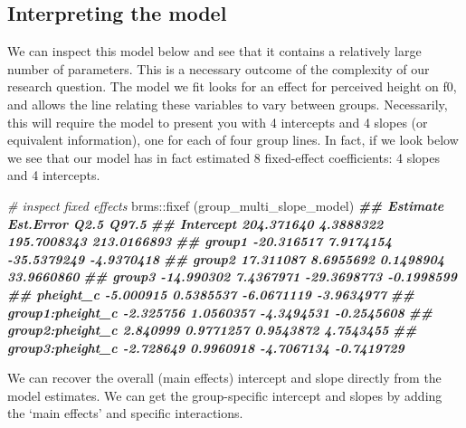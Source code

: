 \documentclass[
]{book}
\newenvironment{Shaded}{\begin{snugshade}}{\end{snugshade}}
\newcommand{\CommentTok}[1]{\textcolor[rgb]{0.56,0.35,0.01}{\textit{#1}}}
\newcommand{\DocumentationTok}[1]{\textcolor[rgb]{0.56,0.35,0.01}{\textbf{\textit{#1}}}}
\newcommand{\FunctionTok}[1]{\textcolor[rgb]{0.00,0.00,0.00}{#1}}
\newcommand{\NormalTok}[1]{#1}
\newcommand{\SpecialCharTok}[1]{\textcolor[rgb]{0.00,0.00,0.00}{#1}}
\begin{document}
\hypertarget{interpreting-the-model-3}{%
\subsection{Interpreting the model}\label{interpreting-the-model-3}}

We can inspect this model below and see that it contains a relatively large number of parameters. This is a necessary outcome of the complexity of our research question. The model we fit looks for an effect for perceived height on f0, and allows the line relating these variables to vary between groups. Necessarily, this will require the model to present you with 4 intercepts and 4 slopes (or equivalent information), one for each of four group lines. In fact, if we look below we see that our model has in fact estimated 8 fixed-effect coefficients: 4 slopes and 4 intercepts.

\begin{Shaded}
\begin{Highlighting}[]
\CommentTok{\# inspect fixed effects}
\NormalTok{brms}\SpecialCharTok{::}\FunctionTok{fixef}\NormalTok{ (group\_multi\_slope\_model)}
\DocumentationTok{\#\#                    Estimate Est.Error        Q2.5       Q97.5}
\DocumentationTok{\#\# Intercept        204.371640 4.3888322 195.7008343 213.0166893}
\DocumentationTok{\#\# group1           {-}20.316517 7.9174154 {-}35.5379249  {-}4.9370418}
\DocumentationTok{\#\# group2            17.311087 8.6955692   0.1498904  33.9660860}
\DocumentationTok{\#\# group3           {-}14.990302 7.4367971 {-}29.3698773  {-}0.1998599}
\DocumentationTok{\#\# pheight\_c         {-}5.000915 0.5385537  {-}6.0671119  {-}3.9634977}
\DocumentationTok{\#\# group1:pheight\_c  {-}2.325756 1.0560357  {-}4.3494531  {-}0.2545608}
\DocumentationTok{\#\# group2:pheight\_c   2.840999 0.9771257   0.9543872   4.7543455}
\DocumentationTok{\#\# group3:pheight\_c  {-}2.728649 0.9960918  {-}4.7067134  {-}0.7419729}
\end{Highlighting}
\end{Shaded}

We can recover the overall (main effects) intercept and slope directly from the model estimates. We can get the group-specific intercept and slopes by adding the `main effects' and specific interactions.
\end{document}
